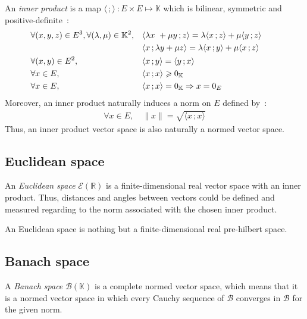 An \emph{inner product} is a map $\langle \,; \rangle~: E \times E \longmapsto \mathbb{K}$ which is bilinear, symmetric and positive-definite~:
\begin{subequations}
\begin{align}
	&\forall (x,y,z) \in E^3, \forall (\lambda,\mu) \in \mathbb{K}^2, 	&& \langle \lambda x\ + \mu y \,; z\rangle  = \lambda \langle  x \,; z\rangle + \mu \langle  y\,; z\rangle&&&\\
	&												&& \langle x \,; \lambda y + \mu z \rangle  = \lambda \langle  x\,; y\rangle + \mu \langle  x \,; z\rangle&&&\notag\\
	&\forall (x,y) \in E^2, 									&& \langle x\,; y\rangle = \langle y\,; x\rangle &&&\\
	&\forall x \in E, 										&& \langle x\,; x\rangle \geqslant 0_\mathbb{K} &&&\\
	&\forall x \in E, 										&& \langle x\,; x\rangle = 0_\mathbb{K} \Rightarrow x = 0_E &&&
\end{align}
\end{subequations}
Moreover, an inner product naturally induces a norm on $E$ defined by~:
\begin{align}
	\forall x \in E, \quad \|x\| = \sqrt{\langle x\,; x\rangle}
\end{align}
Thus, an inner product vector space is also naturally a normed vector space.

\subsection{Euclidean space}
An \emph{Euclidean space} $\mathcal{E}(\mathbb{R})$ is a finite-dimensional real vector space with an inner product.
Thus, distances and angles between vectors could be defined and measured regarding to the norm associated with the chosen inner product.

An Euclidean space is nothing but a finite-dimensional real pre-hilbert space.

\subsection{Banach space}

A \emph{Banach space} $\mathcal{B}(\mathbb{K})$ is a complete normed vector space, which means that it is a normed vector space in which every Cauchy sequence of $\mathcal{B}$ converges in $\mathcal{B}$ for the given norm.


